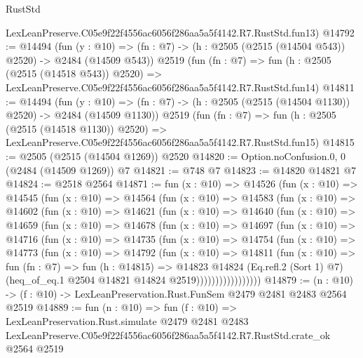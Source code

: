 \begin{lexlean}{RustStd}
\begin{coremodule}
    LexLeanPreserve.C05e9f22f4556ac6056f286aa5a5f4142.R7.RustStd.fun13)
@14792 := @14494
    (fun (y : @10) => (fn : @7) -> (h : @2505 (@2515 (@14504 @543)) @2520) -> @2484 (@14509 @543))
    @2519
    (fun (fn : @7) =>
    fun (h : @2505 (@2515 (@14518 @543)) @2520) =>
    LexLeanPreserve.C05e9f22f4556ac6056f286aa5a5f4142.R7.RustStd.fun14)
@14811 := @14494
    (fun (y : @10) => (fn : @7) -> (h : @2505 (@2515 (@14504 @1130)) @2520) -> @2484 (@14509 @1130))
    @2519
    (fun (fn : @7) =>
    fun (h : @2505 (@2515 (@14518 @1130)) @2520) =>
    LexLeanPreserve.C05e9f22f4556ac6056f286aa5a5f4142.R7.RustStd.fun15)
@14815 := @2505 (@2515 (@14504 @1269)) @2520
@14820 := Option.noConfusion.{0, 0} (@2484 (@14509 @1269)) @7
@14821 := @748 @7
@14823 := @14820 @14821 @7
@14824 := @2518 @2564
@14871 := fun (x : @10) =>
  @14526
    (fun (x : @10) =>
    @14545
      (fun (x : @10) =>
      @14564
        (fun (x : @10) =>
        @14583
          (fun (x : @10) =>
          @14602
            (fun (x : @10) =>
            @14621
              (fun (x : @10) =>
              @14640
                (fun (x : @10) =>
                @14659
                  (fun (x : @10) =>
                  @14678
                    (fun (x : @10) =>
                    @14697
                      (fun (x : @10) =>
                      @14716
                        (fun (x : @10) =>
                        @14735
                          (fun (x : @10) =>
                          @14754
                            (fun (x : @10) =>
                            @14773
                              (fun (x : @10) =>
                              @14792
                                (fun (x : @10) =>
                                @14811
                                  (fun (x : @10) =>
                                  fun (fn : @7) =>
                                  fun (h : @14815) =>
                                  @14823
                                    @14824
                                    (Eq.refl.{2} (Sort 1) @7)
                                    (heq_of_eq.{1} @2504 @14821 @14824 @2519)))))))))))))))))
@14879 := (n : @10) -> (f : @10) -> LexLeanPreservation.Rust.FunSem @2479 @2481 @2483 @2564 @2519
@14889 := fun (n : @10) =>
  fun (f : @10) =>
  LexLeanPreservation.Rust.simulate
    @2479
    @2481
    @2483
    LexLeanPreserve.C05e9f22f4556ac6056f286aa5a5f4142.R7.RustStd.crate_ok
    @2564
    @2519
\end{coremodule}
\end{lexlean}
